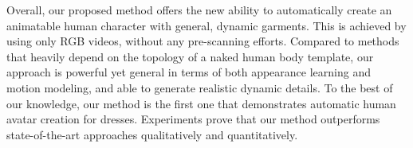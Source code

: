 






Overall, our proposed method offers the new ability to automatically create an animatable human character with general, dynamic garments. This is achieved by using only RGB videos, without any pre-scanning efforts. Compared to methods that heavily depend on the topology of a naked human body template, our approach is powerful yet general in terms of both appearance learning and motion modeling, and able to generate realistic dynamic details. To the best of our knowledge, our method is the first one that demonstrates automatic human avatar creation for dresses. Experiments prove that our method outperforms state-of-the-art approaches qualitatively and quantitatively. 

